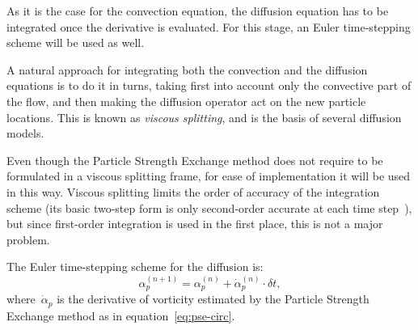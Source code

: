 As it is the case for the convection equation,
the diffusion equation has to be integrated
once the derivative is evaluated.
For this stage,
an Euler time-stepping scheme will be used as well.

A natural approach for integrating both the convection and the diffusion equations
is to do it in turns, taking first into account only the convective part of the flow,
and then making the diffusion operator act on the new particle locations.
This is known as \emph{viscous splitting},
and is the basis of several diffusion models.

Even though the Particle Strength Exchange method
does not require to be formulated
in a viscous splitting frame,
for ease of implementation it will be used in this way.
Viscous splitting limits the order of accuracy of the integration scheme
(its basic two-step form is only second-order accurate
at each time step~\cite[\S2.1.1]{barba04}),
but since first-order integration is used in the first place,
this is not a major problem.

The Euler time-stepping scheme for the diffusion is:
\begin{equation}
  \label{eq:euler-diffusion}
  α_p^{(n + 1)} = α_p^{(n)} + \dot{α}_p^{(n)}\cdot δt,
\end{equation}
where~\(\dot{α}_p\) is the derivative of vorticity
estimated by the Particle Strength Exchange method
as in equation~\eqref{eq:pse-circ}.

